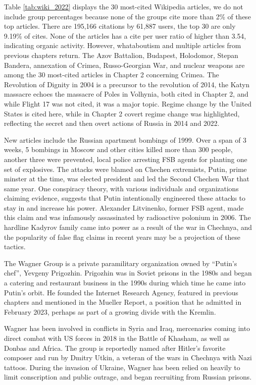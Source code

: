 \documentclass[doublespacing]{utdthesis}
\begin{document}
Table \ref{tab:wiki_2022} displays the 30 most-cited Wikipedia articles, we do not include group percentages because none of the groups cite more than 2\% of these top articles.
There are 195,166 citations by 61,887 users, the top 30 are only 9.19\% of cites.
None of the articles has a cite per user ratio of higher than 3.54, indicating organic activity.
However, whataboutism and multiple articles from previous chapters return.
The Azov Battalion, Budapest, Holodomor, Stepan Bandera, annexation of Crimea, Russo-Georgian War, and nuclear weapons are among the 30 most-cited articles in Chapter 2 concerning Crimea.
The Revolution of Dignity in 2004 is a precursor to the revolution of 2014, the Katyn massacre echoes the massacre of Poles in Volhynia, both cited in Chapter 2, and while Flight 17 was not cited, it was a major topic.
Regime change by the United States is cited here, while in Chapter 2 covert regime change was highlighted, reflecting the secret and then overt actions of Russia in 2014 and 2022.

New articles include the Russian apartment bombings of 1999.
Over a span of 3 weeks, 5 bombings in Moscow and other cities killed more than 300 people, another three were prevented, local police arresting FSB agents for planting one set of explosives.
The attacks were blamed on Chechen extremists, Putin, prime minster at the time, was elected president and led the Second Chechen War that same year.
One conspiracy theory, with various individuals and organizations claiming evidence, suggests that Putin intentionally engineered these attacks to stay in and increase his power.
Alexander Litvinenko, former FSB agent, made this claim and was infamously assassinated by radioactive polonium in 2006.
The hardline Kadyrov family came into power as a result of the war in Chechnya, and the popularity of false flag claims in recent years may be a projection of these tactics.

The Wagner Group is a private paramilitary organization owned by ``Putin's chef'', Yevgeny Prigozhin.
Prigozhin was in Soviet prisons in the 1980s and began a catering and restaurant business in the 1990s during which time he came into Putin's orbit.
He founded the Internet Research Agency, featured in previous chapters and mentioned in the Mueller Report, a position that he admitted in February 2023, perhaps as part of a growing divide with the Kremlin.

Wagner has been involved in conflicts in Syria and Iraq, mercenaries coming into direct combat with US forces in 2018 in the Battle of Khasham, as well as Donbas and Africa.
The group is reportedly named after Hitler's favorite composer and run by Dmitry Utkin, a veteran of the wars in Chechnya with Nazi tattoos.
During the invasion of Ukraine, Wagner has been relied on heavily to limit conscription and public outrage, and began recruiting from Russian prisons.
\end{document}
